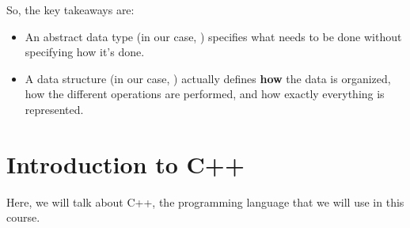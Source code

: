 \documentclass[letterpaper]{article}
\begin{document}
So, the key takeaways are: 
\begin{itemize}
    \item An abstract data type (in our case, ) specifies what needs to be done without specifying how it's done. 
    \item A data structure (in our case, ) actually defines \textbf{how} the data is organized, how the different operations are performed, and how exactly everything is represented.
\end{itemize}











\newpage 
\section{Introduction to C++}
Here, we will talk about C++, the programming language that we will use in this course. 

\end{document}

